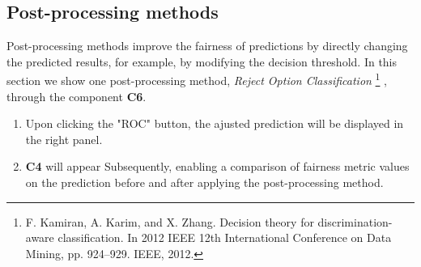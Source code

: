 \begin{VCSet}
    \begin{visualComponent}
    \end{visualComponent}
    
    \begin{visualComponent}
    \end{visualComponent}
\end{VCSet}


\subsection{Post-processing methods}
\par Post-processing methods improve the fairness of predictions by directly changing the predicted results, for example, by modifying the decision threshold. 
In this section we show one post-processing method, \emph{Reject Option Classification}
\footnote{F. Kamiran, A. Karim, and X. Zhang. Decision theory for discrimination-aware classification. In 2012 IEEE 12th International Conference on Data Mining, pp. 924–929. IEEE, 2012.}
, through the component \textbf{C6}.

\begin{enumerate}
    \item Upon clicking the "ROC" button, the ajusted prediction will be displayed in the right panel.
    \item \textbf{C4} will appear Subsequently, enabling a comparison of fairness metric values on the prediction before and after applying the post-processing method.
\end{enumerate}


\begin{VCSet}
    \begin{visualComponent}
    \end{visualComponent}
    
    \begin{visualComponent}
    \end{visualComponent}
\end{VCSet}